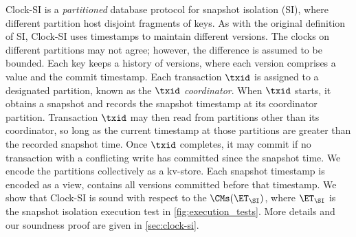 Clock-SI is a \emph{partitioned} database protocol for snapshot isolation (SI),
where different partition host disjoint fragments of keys.
As with the original definition of SI, Clock-SI uses timestamps to maintain different versions. 
The clocks on different partitions may not agree; however, the difference is assumed to be bounded.
Each key keeps a history of versions, where each version comprises a value and the commit timestamp.
Each transaction $\txid$ is assigned to a designated partition, known as the $\txid$ \emph{coordinator}. 
When $\txid$ starts, it obtains a snapshot and records the snapshot timestamp at its coordinator partition.
Transaction $\txid$ may then read from partitions other than its coordinator, so long as the current timestamp at those partitions are greater than the recorded snapshot time. 
Once $\txid$ completes, it may commit if  no transaction with a conflicting write has committed since the snapshot time.
We encode the partitions collectively as a kv-store. 
Each snapshot timestamp is encoded as a view, contains all versions committed before that timestamp.
We show that Clock-SI is sound with respect to the $\CMs(\ET_\SI)$, 
where $\ET_\SI$ is the snapshot isolation execution test in \cref{fig:execution_tests}.
More details and our soundness proof are given in \cref{sec:clock-si}.
